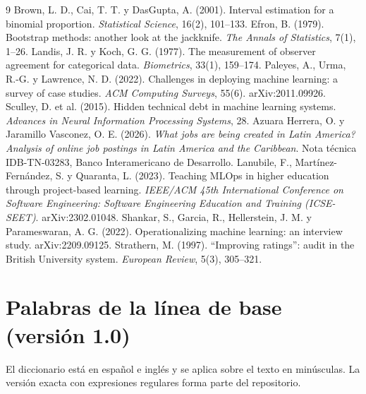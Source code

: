 \documentclass[11pt,a4paper]{article}
\begin{document}
\begin{thebibliography}{9}
 Brown, L. D., Cai, T. T. y DasGupta, A. (2001). Interval estimation for a binomial proportion. \emph{Statistical Science}, 16(2), 101--133.
 Efron, B. (1979). Bootstrap methods: another look at the jackknife. \emph{The Annals of Statistics}, 7(1), 1--26.
 Landis, J. R. y Koch, G. G. (1977). The measurement of observer agreement for categorical data. \emph{Biometrics}, 33(1), 159--174.
 Paleyes, A., Urma, R.-G. y Lawrence, N. D. (2022). Challenges in deploying machine learning: a survey of case studies. \emph{ACM Computing Surveys}, 55(6). arXiv:2011.09926.
 Sculley, D. et al. (2015). Hidden technical debt in machine learning systems. \emph{Advances in Neural Information Processing Systems}, 28.
 Azuara Herrera, O. y Jaramillo Vasconez, O. E. (2026). \emph{What jobs are being created in Latin America? Analysis of online job postings in Latin America and the Caribbean}. Nota técnica IDB-TN-03283, Banco Interamericano de Desarrollo.
 Lanubile, F., Martínez-Fernández, S. y Quaranta, L. (2023). Teaching MLOps in higher education through project-based learning. \emph{IEEE/ACM 45th International Conference on Software Engineering: Software Engineering Education and Training (ICSE-SEET)}. arXiv:2302.01048.
 Shankar, S., Garcia, R., Hellerstein, J. M. y Parameswaran, A. G. (2022). Operationalizing machine learning: an interview study. arXiv:2209.09125.
 Strathern, M. (1997). ``Improving ratings'': audit in the British University system. \emph{European Review}, 5(3), 305--321.
\end{thebibliography}

\appendix
\section{Palabras de la línea de base (versión 1.0)}
El diccionario está en español e inglés y se aplica sobre el texto en minúsculas. La versión exacta con expresiones regulares forma parte del repositorio.
\end{document}
